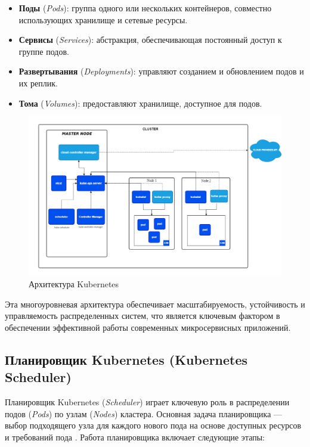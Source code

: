 \begin{itemize}
   \item \textbf{Поды} (\textit{Pods}): группа одного или нескольких
контейнеров, совместно использующих хранилище и сетевые ресурсы.
   \item \textbf{Сервисы} (\textit{Services}): абстракция, обеспечивающая
постоянный доступ к группе подов.
   \item \textbf{Развертывания} (\textit{Deployments}): управляют созданием и
обновлением подов и их реплик.
   \item \textbf{Тома} (\textit{Volumes}): предоставляют хранилище, доступное
для подов.
\end{itemize}

\begin{figure}[h]
   \centering
   \includegraphics[scale=0.4]{img/8.png}
   \caption{Архитектура Kubernetes}
   \label{fig:ccg}
 \end{figure}

Эта многоуровневая архитектура обеспечивает масштабируемость, устойчивость и
управляемость распределенных систем, что является ключевым фактором в
обеспечении эффективной работы современных микросервисных приложений.

\subsection*{Планировщик Kubernetes (Kubernetes Scheduler)}

Планировщик Kubernetes (\textit{Scheduler}) играет ключевую роль в распределении
подов (\textit{Pods}) по узлам (\textit{Nodes}) кластера. Основная задача
планировщика — выбор подходящего узла для каждого нового пода на основе
доступных
ресурсов и требований пода \cite{luksa2017kubernetes}.
Работа планировщика включает следующие этапы:

